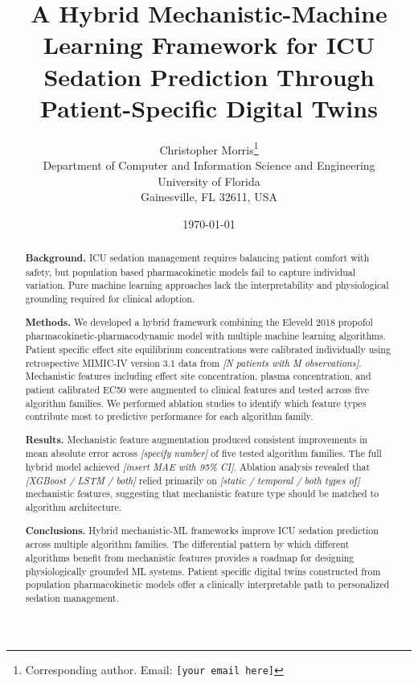 \documentclass[11pt,a4paper]{article}
\title{
    A Hybrid Mechanistic-Machine Learning Framework for ICU Sedation
    Prediction Through Patient-Specific Digital Twins
}
\author{
    Christopher Morris\thanks{Corresponding author. Email: \texttt{[your email here]}} \\
    Department of Computer and Information Science and Engineering \\
    University of Florida \\
    Gainesville, FL 32611, USA
}
\date{\today}
\newcommand{\placeholder}[1]{\textcolor{placeholdergray}{\textit{[#1]}}}
\begin{document}
\maketitle

%
%
%

\begin{abstract}

\noindent\textbf{Background.}
ICU sedation management requires balancing patient comfort with safety,
but population based pharmacokinetic models fail to capture individual
variation. Pure machine learning approaches lack the interpretability
and physiological grounding required for clinical adoption.

\noindent\textbf{Methods.}
We developed a hybrid framework combining the Eleveld 2018 propofol
pharmacokinetic-pharmacodynamic model with multiple machine learning
algorithms. Patient specific effect site equilibrium concentrations
were calibrated individually using retrospective MIMIC-IV version 3.1
data from \placeholder{N patients with M observations}. Mechanistic
features including effect site concentration, plasma concentration,
and patient calibrated EC50 were augmented to clinical features and
tested across five algorithm families. We performed ablation studies
to identify which feature types contribute most to predictive
performance for each algorithm family.

\noindent\textbf{Results.}
Mechanistic feature augmentation produced consistent improvements in
mean absolute error across \placeholder{specify number} of five
tested algorithm families. The full hybrid model achieved
\placeholder{insert MAE with 95\% CI}. Ablation analysis revealed that
\placeholder{XGBoost / LSTM / both} relied primarily on
\placeholder{static / temporal / both types of} mechanistic features,
suggesting that mechanistic feature type should be matched to
algorithm architecture.

\noindent\textbf{Conclusions.}
Hybrid mechanistic-ML frameworks improve ICU sedation prediction across
multiple algorithm families. The differential pattern by which different
algorithms benefit from mechanistic features provides a roadmap for
designing physiologically grounded ML systems. Patient specific digital
twins constructed from population pharmacokinetic models offer a
clinically interpretable path to personalized sedation management.

\end{abstract}
\end{document}
